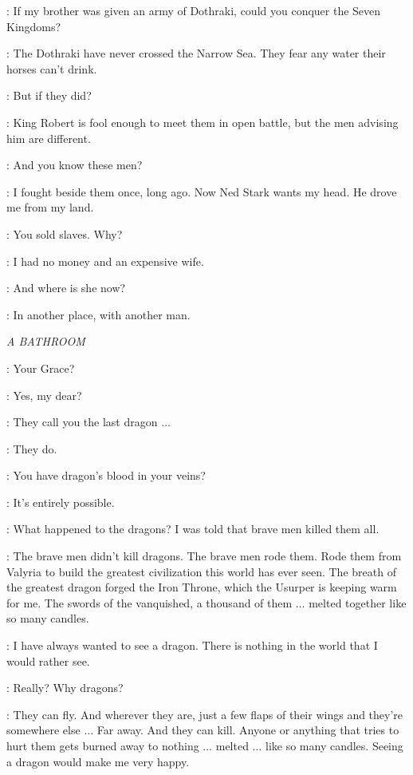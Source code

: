 
\DAENERYS: If my brother was given an army of Dothraki, could you conquer the Seven Kingdoms? 

\JORAH: The Dothraki have never crossed the Narrow Sea. They fear any water their horses can't drink. 

\DAENERYS: But if they did? 

\JORAH: King Robert is fool enough to meet them in open battle, but the men advising him are different. 

\DAENERYS: And you know these men? 

\JORAH: I fought beside them once, long ago. Now Ned Stark wants my head. He drove me from my land. 

\DAENERYS: You sold slaves. Why? 

\JORAH: I had no money and an expensive wife. 

\DAENERYS: And where is she now? 

\JORAH: In another place, with another man. 

\scene

\textit{A BATHROOM}


\DOREAH: Your Grace? 

\VISERYS: Yes, my dear? 

\DOREAH: They call you the last dragon  $\ldots$ 

\VISERYS: They do. 

\DOREAH: You have dragon's blood in your veins? 

\VISERYS: It's entirely possible. 

\DOREAH: What happened to the dragons? I was told that brave men killed them all. 

\VISERYS: The brave men didn't kill dragons. The brave men rode them. Rode them from Valyria to build the greatest civilization this world has ever seen. The breath of the greatest dragon forged the Iron Throne, which the Usurper is keeping warm for me. The swords of the vanquished, a thousand of them $\ldots$ melted together like so many candles. 

\DOREAH: I have always wanted to see a dragon. There is nothing in the world that I would rather see. 

\VISERYS: Really? Why dragons? 

\DOREAH: They can fly. And wherever they are, just a few flaps of their wings and they're somewhere else $\ldots$ Far away. And they can kill.  Anyone or anything that tries to hurt them gets burned away to nothing $\ldots$ melted $\ldots$ like so many candles. Seeing a dragon would make me very happy. 

